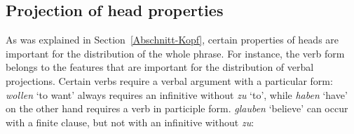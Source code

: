 \subsection{Projection of head properties}
\label{Abschnitt-Kopfeigenschaften}

As was explained in Section~\ref{Abschnitt-Kopf}, certain properties of heads are important for the distribution of
the whole phrase. For instance, the verb form belongs to the features that are important for the
distribution of verbal projections. Certain verbs require a verbal argument with a particular form:
\eal
\label{bsp-projektion-v-merkmale}
\zl
\emph{wollen} `to want' always requires an infinitive without \emph{zu} `to', while \emph{haben} `have' on the other hand requires a verb in participle form.
\emph{glauben} `believe' can occur with a finite clause, but not with an infinitive without \emph{zu}:
\eal
{}
\zl

